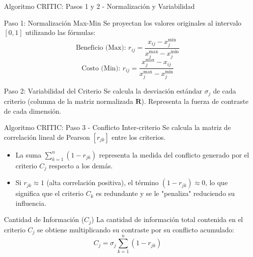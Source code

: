 \documentclass[aspectratio=169, 10pt]{beamer}
\begin{document}
\begin{frame}{Algoritmo CRITIC: Pasos 1 y 2 - Normalización y Variabilidad}
    \begin{block}{Paso 1: Normalización Max-Min}
        Se proyectan los valores originales al intervalo $[0, 1]$ utilizando las fórmulas:
        \[ \text{Beneficio (Max): } r_{ij} = \frac{x_{ij} - x_j^{\min}}{x_j^{\max} - x_j^{\min}} \]
        \[ \text{Costo (Min): } r_{ij} = \frac{x_j^{\max} - x_{ij}}{x_j^{\max} - x_j^{\min}} \]
    \end{block}
    
    \begin{block}{Paso 2: Variabilidad del Criterio}
        Se calcula la desviación estándar $\sigma_j$ de cada criterio (columna de la matriz normalizada $\mathbf{R}$). Representa la fuerza de contraste de cada dimensión.
    \end{block}
\end{frame}

\begin{frame}{Algoritmo CRITIC: Paso 3 - Conflicto Inter-criterio}
    Se calcula la matriz de correlación lineal de Pearson $[r_{jk}]$ entre los criterios.
    \begin{itemize}
        \item La suma $\sum_{k=1}^{n} (1 - r_{jk})$ representa la medida del conflicto generado por el criterio $C_j$ respecto a los demás.
        \item Si $r_{jk} \approx 1$ (alta correlación positiva), el término $(1 - r_{jk}) \approx 0$, lo que significa que el criterio $C_k$ es redundante y se le "penaliza" reduciendo su influencia.
    \end{itemize}
    
    \begin{block}{Cantidad de Información ($C_j$)}
        La cantidad de información total contenida en el criterio $C_j$ se obtiene multiplicando su contraste por su conflicto acumulado:
        \[ C_j = \sigma_j \sum_{k=1}^{n} (1 - r_{jk}) \]
    \end{block}
\end{frame}
\end{document}
